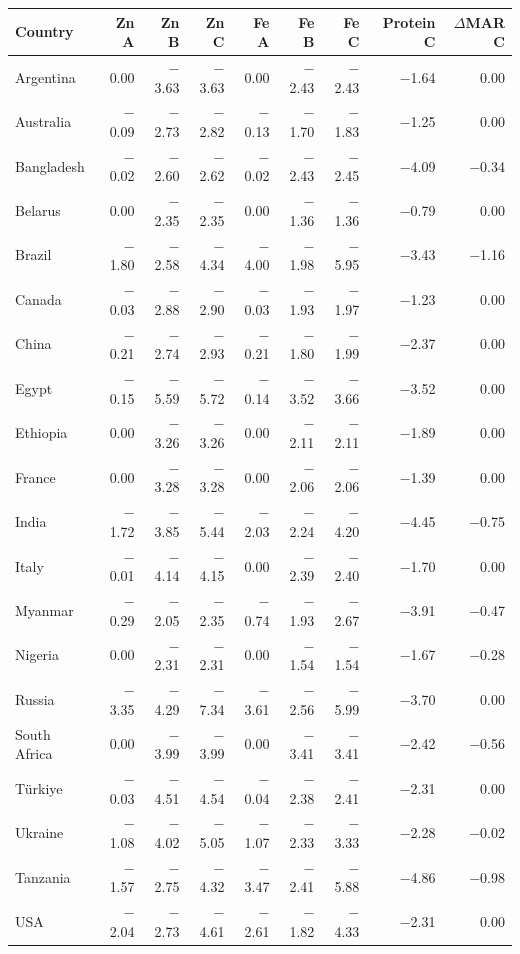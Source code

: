 \begin{tabular}{@{}lrrrrrrrr@{}}
\toprule
Country & Zn A & Zn B & Zn C & Fe A & Fe B & Fe C & Protein C & $\Delta$MAR C \\
\midrule
Argentina & 0.00 & $-$3.63 & $-$3.63 & 0.00 & $-$2.43 & $-$2.43 & $-$1.64 & 0.00 \\
Australia & $-$0.09 & $-$2.73 & $-$2.82 & $-$0.13 & $-$1.70 & $-$1.83 & $-$1.25 & 0.00 \\
Bangladesh & $-$0.02 & $-$2.60 & $-$2.62 & $-$0.02 & $-$2.43 & $-$2.45 & $-$4.09 & $-$0.34 \\
Belarus & 0.00 & $-$2.35 & $-$2.35 & 0.00 & $-$1.36 & $-$1.36 & $-$0.79 & 0.00 \\
Brazil & $-$1.80 & $-$2.58 & $-$4.34 & $-$4.00 & $-$1.98 & $-$5.95 & $-$3.43 & $-$1.16 \\
Canada & $-$0.03 & $-$2.88 & $-$2.90 & $-$0.03 & $-$1.93 & $-$1.97 & $-$1.23 & 0.00 \\
China & $-$0.21 & $-$2.74 & $-$2.93 & $-$0.21 & $-$1.80 & $-$1.99 & $-$2.37 & 0.00 \\
Egypt & $-$0.15 & $-$5.59 & $-$5.72 & $-$0.14 & $-$3.52 & $-$3.66 & $-$3.52 & 0.00 \\
Ethiopia & 0.00 & $-$3.26 & $-$3.26 & 0.00 & $-$2.11 & $-$2.11 & $-$1.89 & 0.00 \\
France & 0.00 & $-$3.28 & $-$3.28 & 0.00 & $-$2.06 & $-$2.06 & $-$1.39 & 0.00 \\
India & $-$1.72 & $-$3.85 & $-$5.44 & $-$2.03 & $-$2.24 & $-$4.20 & $-$4.45 & $-$0.75 \\
Italy & $-$0.01 & $-$4.14 & $-$4.15 & 0.00 & $-$2.39 & $-$2.40 & $-$1.70 & 0.00 \\
Myanmar & $-$0.29 & $-$2.05 & $-$2.35 & $-$0.74 & $-$1.93 & $-$2.67 & $-$3.91 & $-$0.47 \\
Nigeria & 0.00 & $-$2.31 & $-$2.31 & 0.00 & $-$1.54 & $-$1.54 & $-$1.67 & $-$0.28 \\
Russia & $-$3.35 & $-$4.29 & $-$7.34 & $-$3.61 & $-$2.56 & $-$5.99 & $-$3.70 & 0.00 \\
South Africa & 0.00 & $-$3.99 & $-$3.99 & 0.00 & $-$3.41 & $-$3.41 & $-$2.42 & $-$0.56 \\
T\"urkiye & $-$0.03 & $-$4.51 & $-$4.54 & $-$0.04 & $-$2.38 & $-$2.41 & $-$2.31 & 0.00 \\
Ukraine & $-$1.08 & $-$4.02 & $-$5.05 & $-$1.07 & $-$2.33 & $-$3.33 & $-$2.28 & $-$0.02 \\
Tanzania & $-$1.57 & $-$2.75 & $-$4.32 & $-$3.47 & $-$2.41 & $-$5.88 & $-$4.86 & $-$0.98 \\
USA & $-$2.04 & $-$2.73 & $-$4.61 & $-$2.61 & $-$1.82 & $-$4.33 & $-$2.31 & 0.00 \\
\bottomrule
\end{tabular}
